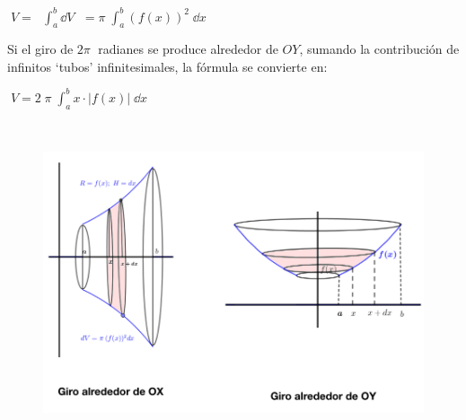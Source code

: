 \hspace{20mm} $\boxed{ \; \displaystyle V = \; }$
\textcolor{gris}{$\int_a^b \dd V$} 
$\boxed{ \; =\pi\; \int_a^b (f(x))^2\; \dd x\; } $

Si el giro de $2\pi\;  $ radianes se produce alrededor de $OY$, sumando la contribución de infinitos `tubos' infinitesimales, la fórmula se convierte en:

\hspace{20mm} $\boxed{ \; \displaystyle V=2\; \pi\; \int_a^b 
x\cdot |f(x)|\; \dd x \; }$

$\quad$

	\begin{figure}[H]
	\centering
	\includegraphics[width=1\textwidth]{imagenes/imagenes08/T08IM23.png}
	\end{figure}

